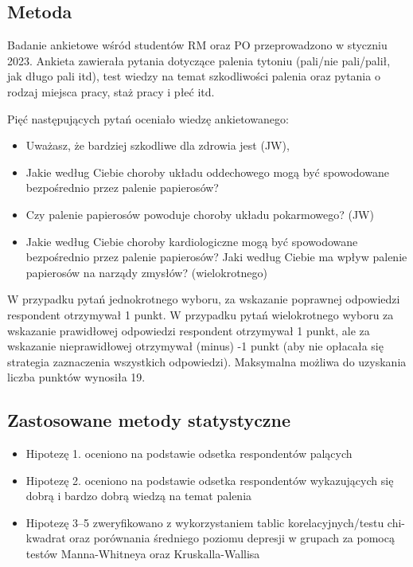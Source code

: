 \documentclass[
  openany]{book}
\providecommand{\tightlist}{%
  \setlength{\itemsep}{0pt}\setlength{\parskip}{0pt}}
\begin{document}
\hypertarget{metoda}{%
\subsection{Metoda}\label{metoda}}

Badanie ankietowe wśród studentów RM oraz PO przeprowadzono w styczniu 2023.
Ankieta zawierała pytania dotyczące palenia tytoniu (pali/nie pali/palił, jak długo pali itd),
test wiedzy na temat szkodliwości palenia oraz pytania
o rodzaj miejsca pracy, staż pracy i płeć itd.

Pięć następujących pytań oceniało wiedzę ankietowanego:

\begin{itemize}
\tightlist
\item
  Uważasz, że bardziej szkodliwe dla zdrowia jest (JW),
\item
  Jakie według Ciebie choroby układu oddechowego mogą być spowodowane
  bezpośrednio przez palenie papierosów?
\item
  Czy palenie papierosów powoduje choroby układu pokarmowego? (JW)
\item
  Jakie według Ciebie choroby kardiologiczne mogą być spowodowane
  bezpośrednio przez palenie papierosów?
  Jaki według Ciebie ma wpływ palenie papierosów na narządy zmysłów? (wielokrotnego)
\end{itemize}

W przypadku pytań jednokrotnego wyboru, za wskazanie poprawnej odpowiedzi respondent otrzymywał 1 punkt.
W przypadku pytań wielokrotnego wyboru za wskazanie prawidłowej odpowiedzi respondent otrzymywał 1 punkt, ale
za wskazanie nieprawidłowej
otrzymywał (minus) -1 punkt (aby nie opłacała się strategia zaznaczenia wszystkich odpowiedzi).
Maksymalna możliwa do uzyskania liczba punktów wynosiła 19.

\hypertarget{zastosowane-metody-statystyczne}{%
\subsection{Zastosowane metody statystyczne}\label{zastosowane-metody-statystyczne}}

\begin{itemize}
\item
  Hipotezę 1. oceniono na podstawie odsetka respondentów palących
\item
  Hipotezę 2. oceniono na podstawie odsetka respondentów wykazujących się dobrą i bardzo dobrą wiedzą na temat palenia
\item
  Hipotezę 3--5 zweryfikowano z wykorzystaniem tablic korelacyjnych/testu chi-kwadrat
  oraz porównania średniego poziomu depresji w grupach za pomocą testów Manna-Whitneya oraz
  Kruskalla-Wallisa
\end{itemize}
\end{document}
